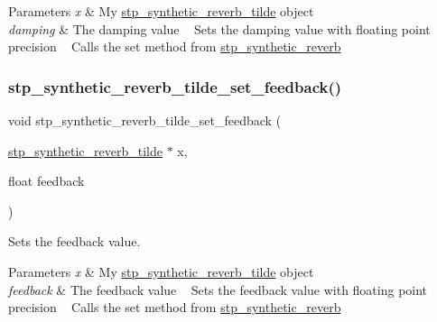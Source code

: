 \begin{DoxyParams}{Parameters}
{\em x} & My \hyperlink{structstp__synthetic__reverb__tilde}{stp\+\_\+synthetic\+\_\+reverb\+\_\+tilde} object ~\newline
 \\
\hline
{\em damping} & The damping value ~\newline
 Sets the damping value with floating point precision ~\newline
 Calls the set method from \hyperlink{structstp__synthetic__reverb}{stp\+\_\+synthetic\+\_\+reverb} ~\newline
 \\
\hline
\end{DoxyParams}
\mbox{\label{structstp__synthetic__reverb__tilde_aac1fe97dc05f40b29497829d9c95b88c}} 
\subsubsection{\texorpdfstring{stp\+\_\+synthetic\+\_\+reverb\+\_\+tilde\+\_\+set\+\_\+feedback()}{stp\_synthetic\_reverb\_tilde\_set\_feedback()}}
{\footnotesize\ttfamily void stp\+\_\+synthetic\+\_\+reverb\+\_\+tilde\+\_\+set\+\_\+feedback (\begin{DoxyParamCaption}\item[{\hyperlink{structstp__synthetic__reverb__tilde}{stp\+\_\+synthetic\+\_\+reverb\+\_\+tilde} $\ast$}]{x,  }\item[{float}]{feedback }\end{DoxyParamCaption})\hspace{0.3cm}{\ttfamily [related]}}



Sets the feedback value. ~\newline
 


\begin{DoxyParams}{Parameters}
{\em x} & My \hyperlink{structstp__synthetic__reverb__tilde}{stp\+\_\+synthetic\+\_\+reverb\+\_\+tilde} object ~\newline
 \\
\hline
{\em feedback} & The feedback value ~\newline
 Sets the feedback value with floating point precision ~\newline
 Calls the set method from \hyperlink{structstp__synthetic__reverb}{stp\+\_\+synthetic\+\_\+reverb} ~\newline
 \\
\hline
\end{DoxyParams}


